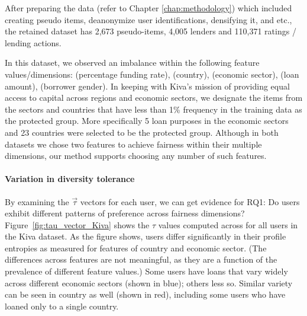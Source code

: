 
After preparing the data (refer to Chapter \ref{chap:methodology}) which included creating pseudo items, deanonymize user identifications, densifying it, and etc., the retained dataset has 2,673 pseudo-items, 4,005 lenders and 110,371 ratings / lending actions.

In this dataset, we observed an imbalance within the following feature values/dimensions: (percentage funding rate), (country), (economic sector), (loan amount), (borrower gender). In keeping with Kiva's mission of providing equal access to capital across regions and economic sectors, we designate the items from the sectors and countries that have less than 1\% frequency in the training data as the protected group. More specifically 5 loan purposes in the economic sectors and 23 countries were selected to be the protected group. 
Although in both datasets we chose two features to achieve fairness within their multiple dimensions, our method supports choosing any number of such features.

\noindent\paragraph{\textbf{Variation in diversity tolerance}}
\newline
\indent By examining the $\vec{\tau}$ vectors for each user, we can get evidence for RQ1: Do users exhibit different patterns of preference across fairness dimensions?
Figure~\ref{fig:tau_vector_Kiva} shows the $\tau$ values computed across for all users in the Kiva dataset. As the figure shows, users differ significantly in their profile entropies as measured for features of country and economic sector. (The differences across features are not meaningful, as they are a function of the prevalence of different feature values.) Some users have loans that vary widely across different economic sectors (shown in blue); others less so. Similar variety can be seen in country as well (shown in red), including some users who have loaned only to a single country.

